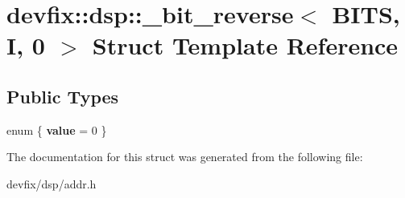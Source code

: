 \hypertarget{structdevfix_1_1dsp_1_1__bit__reverse_3_01BITS_00_01I_00_010_01_4}{}\section{devfix\+:\+:dsp\+:\+:\+\_\+bit\+\_\+reverse$<$ B\+I\+TS, I, 0 $>$ Struct Template Reference}
\label{structdevfix_1_1dsp_1_1__bit__reverse_3_01BITS_00_01I_00_010_01_4}
\subsection*{Public Types}
\begin{DoxyCompactItemize}
\item 
\mbox{\label{structdevfix_1_1dsp_1_1__bit__reverse_3_01BITS_00_01I_00_010_01_4_ac864c957eb8651cf4a555f846ca0536a}} 
enum \{ {\bfseries value} = 0
 \}
\end{DoxyCompactItemize}


The documentation for this struct was generated from the following file\+:\begin{DoxyCompactItemize}
\item 
devfix/dsp/addr.\+h\end{DoxyCompactItemize}
